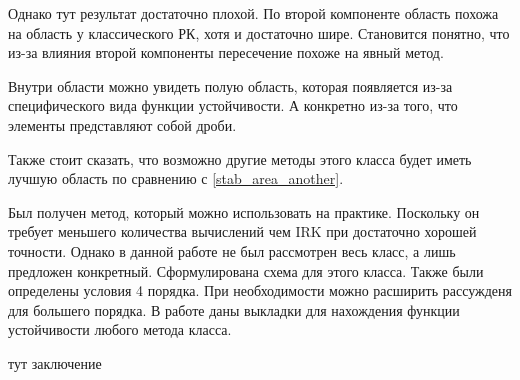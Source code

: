 \documentclass[a4paper,article,14pt]{extarticle}
\begin{document}
Однако тут результат достаточно плохой. По второй компоненте область похожа на область у классического РК, хотя и достаточно шире. Становится понятно, что из-за влияния второй компоненты пересечение похоже на явный метод.

Внутри области можно увидеть полую область, которая появляется из-за специфического вида функции устойчивости. А конкретно из-за того, что элементы представляют собой дроби.

Также стоит сказать, что возможно другие методы этого класса будет иметь лучшую область по сравнению с \ref{stab_area_another}.
\pagebreak


Был получен метод, который можно использовать на практике. Поскольку он требует меньшего количества вычислений чем IRK при достаточно хорошей точности. Однако в данной работе не был рассмотрен весь класс, а лишь предложен конкретный. Сформулирована схема для этого класса. Также были определены условия 4 порядка. При необходимости можно расширить рассужденя для большего порядка. В работе даны выкладки для нахождения функции устойчивости любого метода класса.
\pagebreak

тут заключение
\pagebreak
\end{document}

